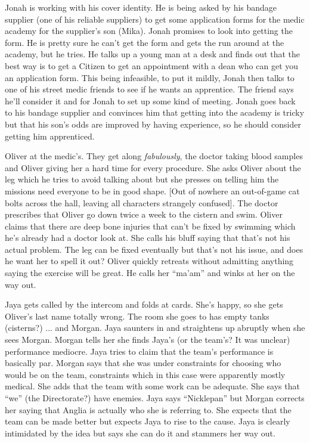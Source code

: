 
Jonah is working with his cover identity.  He is being asked by his bandage supplier (one of his reliable suppliers) to get some application forms for the medic academy for the supplier's son (Mika).  Jonah promises to look into getting the form.  He is pretty sure he can't get the form and gets the run around at the academy, but he tries.  He talks up a young man at a desk and finds out that the best way is to get a Citizen to get an appointment with a dean who can get you an application form.  This being infeasible, to put it mildly, Jonah then talks to one of his street medic friends to see if he wants an apprentice.  The friend says he'll consider it and for Jonah to set up some kind of meeting.  Jonah goes back to his bandage supplier and convinces him that getting into the academy is tricky but that his son's odds are improved by having experience, so he should consider getting him apprenticed.






Oliver at the medic's.  They get along \textit{fabulously}, the doctor taking blood samples and Oliver giving her a hard time for every procedure.  She asks Oliver about the leg which he tries to avoid talking about but she presses on telling him the missions need everyone to be in good shape.  {[}Out of nowhere an out-of-game cat bolts across the hall, leaving all characters strangely confused{]}.  The doctor prescribes that Oliver go down twice a week to the cistern and swim.  Oliver claims that there are deep bone injuries that can't be fixed by swimming which he's already had a doctor look at.  She calls his bluff saying that that's not his actual problem.  The leg can be fixed eventually but that's not his issue, and does he want her to spell it out?  Oliver quickly retreats without admitting anything saying the exercise will be great.  He calls her ``ma'am'' and winks at her on the way out.




Jaya gets called by the intercom and folds at cards.  She's happy, so she gets Oliver's last name totally wrong.  The room she goes to has empty tanks (cisterns?) ... and Morgan.  Jaya saunters in and straightens up abruptly when she sees Morgan.  Morgan tells her she finds Jaya's (or the team's?  It was unclear) performance mediocre.  Jaya tries to claim that the team's performance is basically par.  Morgan says that she was under constraints for choosing who would be on the team, constraints which in this case were apparently mostly medical.   She adds that the team with some work can be adequate.  She says that ``we'' (the Directorate?) have enemies.  Jaya says ``Nicklepan'' but Morgan corrects her saying that Anglia is actually who she is referring to.  She expects that the team can be made better but expects Jaya to rise to the cause.   Jaya is clearly intimidated by the idea but says she can do it and stammers her way out.


